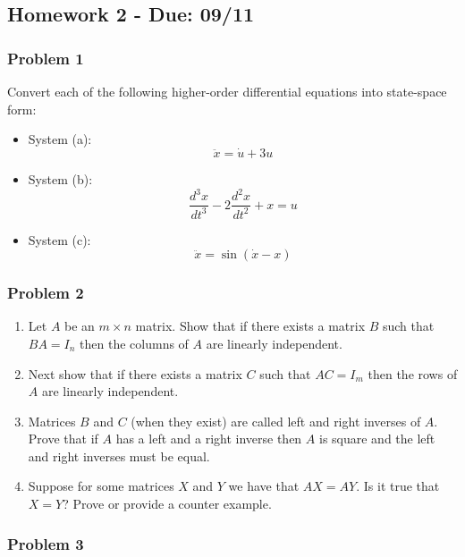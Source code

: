 \subsection{Homework 2 - Due: 09/11}\label{homework-2---due-0911}

\subsubsection{Problem 1}\label{problem-1}

Convert each of the following higher-order differential equations into
state-space form:

\begin{itemize}
\tightlist
\item
  System (a): \[\ddot x = \dot u + 3 u\]
\item
  System (b): \[\dfrac{d^3 x}{dt^3} - 2 \dfrac{d^2x}{dt^2} + x = u\]
\item
  System (c): \[\ddot x = \sin \left( \dot x - x \right)\]
\end{itemize}

\subsubsection{Problem 2}\label{problem-2}

\begin{enumerate}
\def\labelenumi{\alph{enumi}.}
\tightlist
\item
  Let \(A\) be an \(m \times n\) matrix. Show that if there exists a
  matrix \(B\) such that \(BA=I_{n}\) then the columns of \(A\) are
  linearly independent.
\item
  Next show that if there exists a matrix \(C\) such that \(AC=I_{m}\)
  then the rows of \(A\) are linearly independent.
\item
  Matrices \(B\) and \(C\) (when they exist) are called left and right
  inverses of \(A\). Prove that if \(A\) has a left and a right inverse
  then \(A\) is square and the left and right inverses must be equal.
\item
  Suppose for some matrices \(X\) and \(Y\) we have that \(AX = AY\). Is
  it true that \(X=Y\)? Prove or provide a counter example.
\end{enumerate}

\subsubsection{Problem 3}\label{problem-3}

